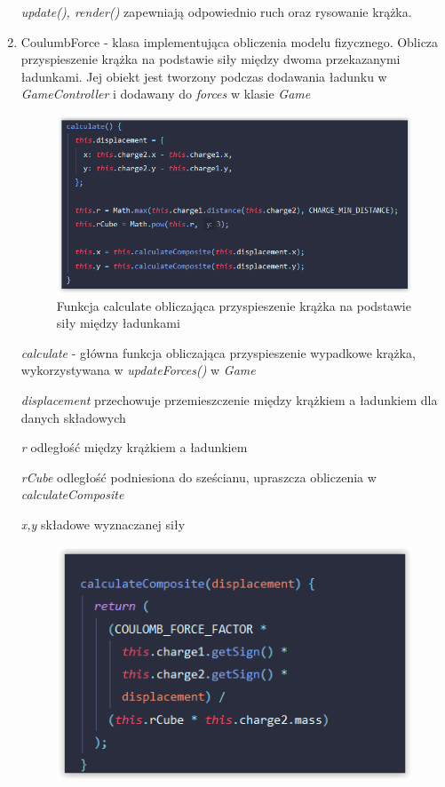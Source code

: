 \documentclass{article}
\begin{document}
\begin{enumerate}
   \textit{update(), render()} zapewniają odpowiednio ruch oraz rysowanie krążka.
   
   \item CoulumbForce - klasa implementująca obliczenia modelu fizycznego. Oblicza przyspieszenie krążka na podstawie siły między dwoma przekazanymi ładunkami. Jej obiekt jest tworzony podczas dodawania ładunku w \emph{GameController} i dodawany do \emph{forces} w klasie \emph{Game}
  
    \begin{figure}[h]
    \centering
    \includegraphics[scale=0.8]{img/Funkcja_calculate.PNG}

    \caption{Funkcja calculate obliczająca przyspieszenie krążka na podstawie siły między ładunkami}
    \label{fig:Funkcja_calculate}
\end{figure}

\emph{calculate} - główna funkcja obliczająca przyspieszenie wypadkowe krążka, wykorzystywana w \emph{updateForces()} w \emph{Game}

\emph{displacement} przechowuje przemieszczenie między krążkiem a ładunkiem dla danych składowych

\emph{r} odległość między krążkiem a ładunkiem

\emph{rCube} odległość podniesiona do sześcianu, upraszcza obliczenia w\\
\emph{calculateComposite}

\emph{x,y} składowe wyznaczanej siły

    \begin{figure}[h]
    \centering
    \includegraphics[scale=1.2]{img/calculateComposite.PNG}


\end{figure}
\end{enumerate}
\end{document}
